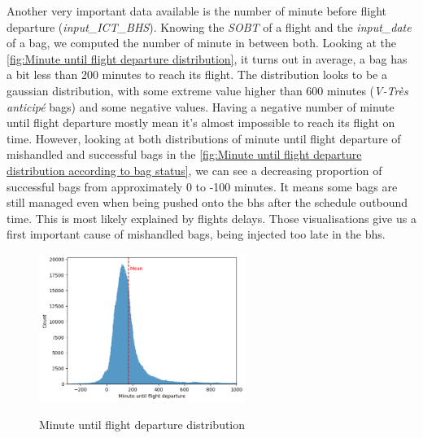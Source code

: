 \documentclass[12pt]{article}
\begin{document}
Another very important data available is the number of minute before flight departure (\textit{input\_ICT\_BHS}). Knowing the \textit{SOBT} of a flight and the \textit{input\_date} of a bag, we computed the number of minute in between both. Looking at the \autoref{fig:Minute until flight departure distribution}, it turns out in average, a bag has a bit less than 200 minutes to reach its flight. The distribution looks to be a gaussian distribution, with some extreme value higher than 600 minutes (\textit{V-Très anticipé} bags) and some negative values. Having a negative number of minute until flight departure mostly mean it's almost impossible to reach its flight on time. However, looking at both distributions of minute until flight departure of mishandled and successful bags in the \autoref{fig:Minute until flight departure distribution according to bag status}, we can see a decreasing proportion of successful bags from approximately 0 to -100 minutes. It means some bags are still managed even when being pushed onto the \acrshort{bhs} after the schedule outbound time. This is most likely explained by flights delays. Those visualisations give us a first important cause of mishandled bags, being injected too late in the \acrshort{bhs}.

\begin{figure}[h]
    \centering
    \includegraphics[width=0.6\textwidth]{Minute until flight departure.png}\\
    \caption{Minute until flight departure distribution}
    \label{fig:Minute until flight departure distribution}
\end{figure}
\FloatBarrier
\end{document}
